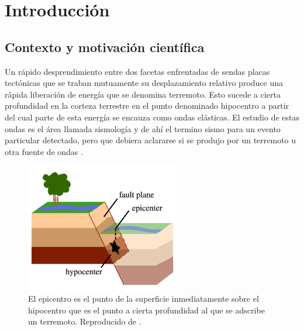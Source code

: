 \documentclass[a4paper]{report}
\begin{document}
\tableofcontents


\chapter{Introducción}

\section{Contexto y motivación científica}\label{sec:contexto}

Un rápido desprendimiento entre dos facetas enfrentadas de sendas placas tectónicas que se traban mutuamente su desplazamiento relativo produce una rápida liberación de energía que se denomina terremoto.
Esto sucede a cierta profundidad en la corteza terrestre en el punto denominado hipocentro a partir del cual parte de esta energía se encauza como ondas elásticas.
El estudio de estas ondas es el área llamada sismología y de ahí el termino sismo para un evento particular detectado, pero que debiera aclararse si se produjo por un terremoto u otra fuente de ondas \cite[sección 4.1.1]{fowler_solid_1990}.

\begin{figure}[!ht]
  \centering
	\includegraphics[width=0.6\textwidth]{eq-ed-fault-labeled.png}
	\caption{El epicentro es el punto de la superficie inmediatamente sobre el hipocentro que es el punto a cierta profundidad al que se adscribe un terremoto.
	Reproducido de \cite{lisa_wald_science_nodate}.}
	\label{fig:epicentro_hipocentro}
\end{figure}
\end{document}
